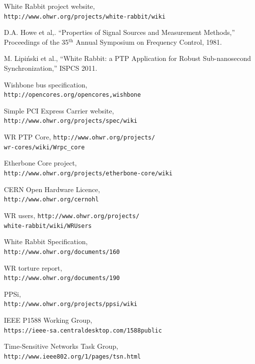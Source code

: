 \documentclass{../JAC2003}
\begin{document}
\begin{thebibliography}{99} %

White Rabbit project website,\\\texttt{http://www.ohwr.org/projects/white-rabbit/wiki}

D.A. Howe et al,. ``Properties of Signal Sources and Measurement
Methods,'' Proceedings of the 35$^{\textrm{th}}$ Annual Symposium on
Frequency Control, 1981.

M. Lipi\'{n}ski et al., ``White Rabbit: a PTP Application for Robust
Sub-nanosecond Synchronization,'' ISPCS 2011.

Wishbone bus specification,\\\texttt{http://opencores.org/opencores,wishbone}

Simple PCI Express Carrier website,\\\texttt{http://www.ohwr.org/projects/spec/wiki}

WR PTP Core, \texttt{http://www.ohwr.org/projects/}\\
\texttt{wr-cores/wiki/Wrpc\_core}

Etherbone Core
project,\\
\texttt{http://www.ohwr.org/projects/etherbone-core/wiki}

CERN Open Hardware Licence,\\\texttt{http://www.ohwr.org/cernohl}

WR users, \texttt{http://www.ohwr.org/projects/}\\
\texttt{white-rabbit/wiki/WRUsers}

White Rabbit Specification,\\
\texttt{http://www.ohwr.org/documents/160}

WR torture report,\\
\texttt{http://www.ohwr.org/documents/190}

PPSi,\\\texttt{http://www.ohwr.org/projects/ppsi/wiki}

IEEE P1588 Working Group,\\
\texttt{https://ieee-sa.centraldesktop.com/1588public}

Time-Sensitive Networks Task Group,\\
\texttt{http://www.ieee802.org/1/pages/tsn.html}

\end{thebibliography}
\end{document}
